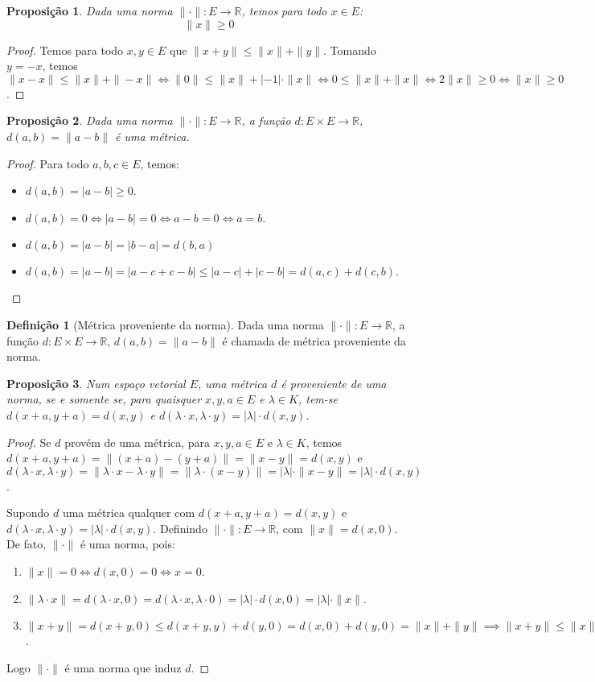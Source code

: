 \documentclass{article}
\newtheorem{prop}{Proposição}[section]
\theoremstyle{theorem}
\theoremstyle{lemma}
\theoremstyle{definition}
\newtheorem{definicao}{Definição}[section]
\theoremstyle{remark}
\begin{document}
\begin{prop}
	Dada uma norma $\| \cdot \|: E \to \mathbb{R}$, temos para todo $x\in E$:
	$$ \|x \| \geq 0 $$
\end{prop}
\begin{proof}
	Temos para todo $x,y \in E$ que $\| x+y\| \leq \|x \| + \| y \|$.  Tomando $y = - x$, temos $\| x-x\| \leq \| x\| + \| -x\| \iff \|0 \| \leq \|x\| + |-1| \cdot \| x\| \iff 0 \leq \|x\| + \|x\| \iff 2\|x\| \geq 0 \iff \|x\| \geq 0$.
\end{proof}
\begin{prop}
	Dada uma norma $\| \cdot \|: E \to \mathbb{R}$, a função $d: E\times E \to \mathbb{R}$, $d(a,b) = \| a-b\|$ é uma métrica.
\end{prop}
\begin{proof}
	Para todo $a,b,c\in E$, temos:
	\begin{itemize}
		\item $d(a,b) = |a-b| \geq 0 $.
		\item $d(a,b) = 0 \iff |a-b| = 0 \iff a-b = 0 \iff a = b.$
		\item $d(a,b) = |a-b| = |b-a| = d(b,a)$
		\item $d(a,b) =  |a-b|  = |a-c+c-b| \leq |a-c| + |c-b| = d(a,c) + d(c,b)$.
	\end{itemize}
\end{proof}
\begin{definicao}[Métrica proveniente da norma]
	Dada uma norma $\| \cdot \|: E \to \mathbb{R}$, a função $d: E\times E \to \mathbb{R}$, $d(a,b) = \| a-b\|$ é chamada de métrica proveniente da norma.
\end{definicao}
\begin{prop}
	Num espaço vetorial $E$, uma métrica $d$ é proveniente de uma norma, se e somente se,  para quaisquer $x,y,a\in E$ e $\lambda\in K$, tem-se $d(x+a, y+a) = d(x,y)$ e $d(\lambda \cdot x, \lambda \cdot y ) = |\lambda| \cdot d(x,y)$.
\end{prop}
\begin{proof}
	Se $d$ provém de uma métrica, para $x,y, a\in E$ e $\lambda \in K$, temos  $d(x+a,y+a) = \|(x+a) -(y+a) \| = \| x- y\| = d(x,y)$ e $d(\lambda \cdot x, \lambda \cdot y ) = \| \lambda\cdot x  - \lambda \cdot y \| = \| \lambda\cdot (x-y) \| = |\lambda|\cdot \| x-y\| = |\lambda | \cdot d(x,y)$.

	Supondo $d$ uma métrica qualquer com $d(x+a, y+a) = d(x,y)$ e $d(\lambda \cdot x, \lambda \cdot y ) = |\lambda| \cdot d(x,y)$. Definindo $\| \cdot \| : E \to \mathbb{R}$, com $\|x\| = d(x,0)$. De fato, $\| \cdot \| $ é uma norma, pois:
	\begin{enumerate}
		\item $\| x\| = 0 \iff d(x,0) = 0 \iff x =0$.
		\item $\| \lambda \cdot x \| = d(\lambda \cdot x, 0) = d(\lambda \cdot x, \lambda \cdot 0) = |\lambda |\cdot d(x,0) = |\lambda|\cdot \| x\|$.
		\item $\| x+y\| = d(x+y,0) \leq d(x+y, y) + d(y , 0) = d(x,0) + d(y,0) = \| x\| + \|y\| \implies \| x+y \| \leq \|x\| +   \|y\|$.
	\end{enumerate}
	Logo $\|\cdot \|$ é uma norma que induz $d$.
\end{proof}
\end{document}
